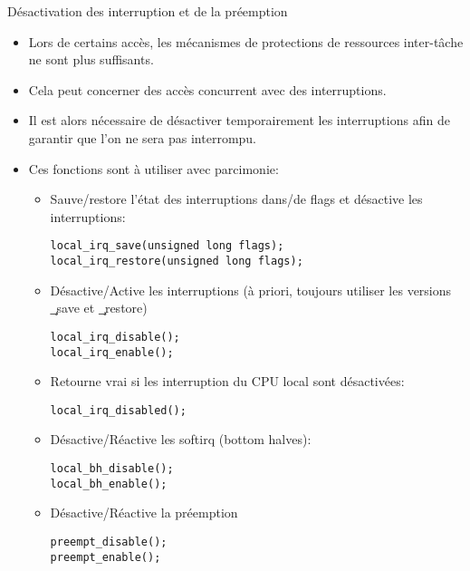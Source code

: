 \begin{frame}[fragile=singleslide]{Désactivation des interruption et de la préemption}
  \begin{itemize} 
  \item  Lors de  certains  accès, les  mécanismes  de protections  de
    ressources inter-tâche ne sont plus suffisants.
  \item   Cela   peut  concerner   des   accès   concurrent  avec   des
    interruptions.
  \item  Il  est alors  nécessaire  de  désactiver temporairement  les
    interruptions afin de garantir que l'on ne sera pas interrompu.
  \item   Ces fonctions sont à utiliser avec parcimonie:
    \begin{itemize} 
    \item  Sauve/restore  l'état  des  interruptions dans/de  flags  et
      désactive les interruptions:
      \begin{lstlisting} 
local_irq_save(unsigned long flags);
local_irq_restore(unsigned long flags);
      \end{lstlisting} 
    \item  Désactive/Active  les  interruptions  (à  priori,  toujours
      utiliser les versions \c{_save} et \c{_restore})
      \begin{lstlisting} 
local_irq_disable();
local_irq_enable();
      \end{lstlisting} 
    \item  Retourne  vrai  si  les  interruption  du  CPU  local  sont
      désactivées:
      \begin{lstlisting} 
local_irq_disabled();
      \end{lstlisting} 
    \item Désactive/Réactive les softirq (bottom halves):
      \begin{lstlisting} 
local_bh_disable();
local_bh_enable();
      \end{lstlisting} 
    \item Désactive/Réactive la préemption
      \begin{lstlisting} 
preempt_disable();
preempt_enable();
      \end{lstlisting} 
    \end{itemize} 
  \end{itemize} 
\end{frame} 

